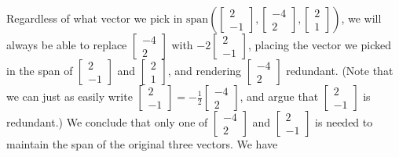 \documentclass{ximera}
\begin{document}
Regardless of what vector we pick in $\mbox{span}\left(\begin{bmatrix}2\\-1\end{bmatrix}, \begin{bmatrix}-4\\2\end{bmatrix}, \begin{bmatrix}2\\1\end{bmatrix}\right)$, we will always be able to replace $\begin{bmatrix}-4\\2\end{bmatrix}$ with $-2\begin{bmatrix}2\\-1\end{bmatrix}$, placing the vector we picked in the span of $\begin{bmatrix}2\\-1\end{bmatrix}$ and $\begin{bmatrix}2\\1\end{bmatrix}$,    and rendering $\begin{bmatrix}-4\\2\end{bmatrix}$ redundant.  (Note that we can just as easily write $\begin{bmatrix}2\\-1\end{bmatrix}=-\frac{1}{2}\begin{bmatrix}-4\\2\end{bmatrix}$, and argue that $\begin{bmatrix}2\\-1\end{bmatrix}$ is redundant.)  We conclude that only one of $\begin{bmatrix}-4\\2\end{bmatrix}$ and $\begin{bmatrix}2\\-1\end{bmatrix}$ is needed to maintain the span of the original three vectors.  We have
\end{document}
